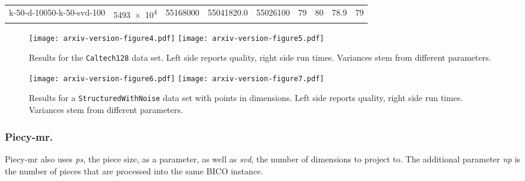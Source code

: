 \documentclass[a4paper]{scrartcl}
\begin{document}
{\begin{longtable}{l@{\hskip 4\tabcolsep}r@{\hskip 4\tabcolsep}r@{\hskip 4\tabcolsep}r@{\hskip 4\tabcolsep}r@{\hskip 8\tabcolsep}r@{\hskip 4\tabcolsep}r@{\hskip 4\tabcolsep}r@{\hskip 4\tabcolsep}r}
k-50-d-10050-k-50-svd-100                   & \num[fixed-exponent=7]{  5493e+4} & \num[fixed-exponent=7]{  55168000} & \num[fixed-exponent=7]{55041820.0} & \num[fixed-exponent=7]{  55026100} & \num[scientific-notation=false,round-mode=places,round-precision=1]{        79} & \num[scientific-notation=false,round-mode=places,round-precision=1]{        80} & \num[scientific-notation=false,round-mode=places,round-precision=1]{      78.9} & \num[scientific-notation=false,round-mode=places,round-precision=1]{        79} \\
\end{longtable}
}

\begin{figure}
\texttt{[image: arxiv-version-figure4.pdf]}
\hfill
\texttt{[image: arxiv-version-figure5.pdf]}
\caption{Results for the \texttt{Caltech128} data set. Left side reports quality, right side run times. Variances stem from different parameters.\label{caltechdiagram}}
\end{figure}

\begin{figure}
\texttt{[image: arxiv-version-figure6.pdf]}
\hfill
\texttt{[image: arxiv-version-figure7.pdf]}
\caption{Results for a \texttt{StructuredWithNoise} data set with  points in  dimensions. Left side reports quality, right side run times. Variances stem from different parameters.\label{swndiagram}}
\end{figure}

\subsubsection*{Piecy-mr.}

Piecy-mr also uses \emph{ps}, the piece size, as a parameter, as well as \emph{svd}, the number of dimensions to project to. The additional parameter \emph{np} is the number of pieces that are processed into the same BICO instance.
\end{document}
